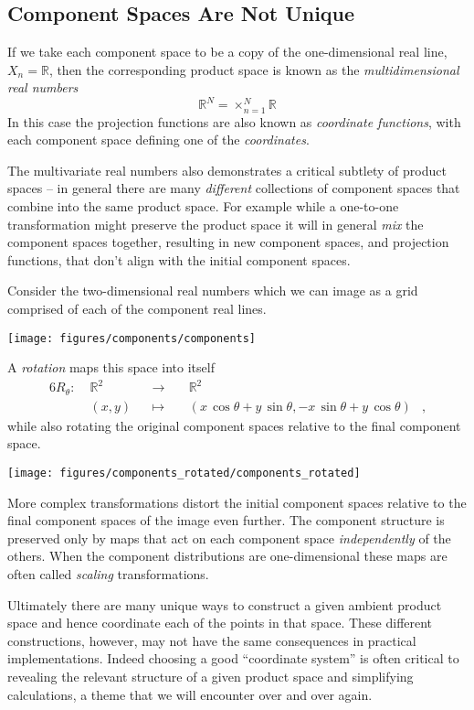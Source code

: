 \documentclass[]{article}
\begin{document}
\hypertarget{component-spaces-are-not-unique}{%
\subsection{Component Spaces Are Not
Unique}\label{component-spaces-are-not-unique}}

If we take each component space to be a copy of the one-dimensional real
line, \(X_{n} = \mathbb{R}\), then the corresponding product space is
known as the \emph{multidimensional real numbers} \[
\mathbb{R}^{N} = \times_{n = 1}^{N} \mathbb{R}
\] In this case the projection functions are also known as
\emph{coordinate functions}, with each component space defining one of
the \emph{coordinates}.

The multivariate real numbers also demonstrates a critical subtlety of
product spaces -- in general there are many \emph{different} collections
of component spaces that combine into the same product space. For
example while a one-to-one transformation might preserve the product
space it will in general \emph{mix} the component spaces together,
resulting in new component spaces, and projection functions, that don't
align with the initial component spaces.

Consider the two-dimensional real numbers which we can image as a grid
comprised of each of the component real lines.

\texttt{[image: figures/components/components]}

A \emph{rotation} maps this space into itself \[
\begin{aligned}{6}
R_{\theta} :\; &\mathbb{R}^{2}& &\rightarrow& \; &\mathbb{R}^{2}&
\\
&(x, y)& &\mapsto& &(x \, \cos \theta + y \, \sin \theta, - x \, \sin \theta + y \, \cos \theta)&,
\end{aligned}
\] while also rotating the original component spaces relative to the
final component space.

\texttt{[image: figures/components\_rotated/components\_rotated]}

More complex transformations distort the initial component spaces
relative to the final component spaces of the image even further. The
component structure is preserved only by maps that act on each component
space \emph{independently} of the others. When the component
distributions are one-dimensional these maps are often called
\emph{scaling} transformations.

Ultimately there are many unique ways to construct a given ambient
product space and hence coordinate each of the points in that space.
These different constructions, however, may not have the same
consequences in practical implementations. Indeed choosing a good
``coordinate system'' is often critical to revealing the relevant
structure of a given product space and simplifying calculations, a theme
that we will encounter over and over again.
\end{document}
